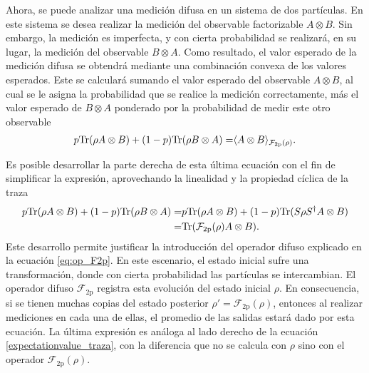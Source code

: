 

Ahora, se puede analizar una medición difusa en un sistema
de dos partículas. En este sistema se desea realizar la medición del observable factorizable $A\otimes B$. Sin embargo, la medición es imperfecta, y con cierta probabilidad se realizará, en su lugar, la medición del observable $B\otimes A$. Como resultado, el valor esperado de la medición difusa se obtendrá mediante una combinación convexa de los valores esperados. Este se calculará sumando el valor esperado del observable $A\otimes B$, al cual se le asigna la probabilidad que se realice la medición correctamente, más el valor esperado de $B\otimes A$ ponderado por la probabilidad de medir este otro observable {\cite{Pineda_2021}}\begin{equation}\label{eq:Expected-Value-FM-2p}
    \begin{split}
         p{\rm Tr}(\rho A\otimes B)+(1-p){\rm Tr}(\rho B\otimes A)=&\langle {A\otimes B}\rangle_{\mathcal{F}_{2\text{p}}(\rho)}.\\
    \end{split}
\end{equation}

%
Es posible desarrollar la parte derecha de esta última ecuación con el fin de simplificar la expresión, aprovechando la linealidad y la propiedad cíclica de la traza \begin{equation}\label{eq:Expected-Value-FM-2p-desarrollo}
    \begin{split}
         p{\rm Tr}(\rho A\otimes B)+(1-p){\rm Tr}(\rho B\otimes A)
        =&p{\rm Tr}(\rho A\otimes B)+(1-p){\rm Tr}(S\rho S^\dagger A\otimes B)\\
        =&{\rm Tr}(\mathcal{F}_{2\text{p}}(\rho)A\otimes B).\\
    \end{split}
\end{equation} Este desarrollo permite justificar la introducción del operador difuso explicado en la ecuación {\eqref{eq:op_F2p}}. En este escenario, el estado inicial sufre una transformación, donde  con cierta probabilidad las partículas se intercambian. El operador difuso $\mathcal{F}_{2\text{p}}$ registra esta evolución del estado inicial $\rho$. En consecuencia, si se tienen muchas copias del estado posterior $\rho'=\mathcal{F}_{2\text{p}}(\rho)$, entonces al realizar mediciones en cada una de ellas, el promedio de las salidas estará dado por esta ecuación.  La última expresión es análoga al lado derecho de la ecuación {\eqref{expectationvalue_traza}}, con la diferencia que no se calcula con $\rho$ sino con el operador $\mathcal{F}_{2\text{p}}(\rho)$.



